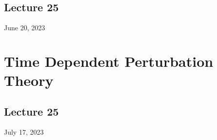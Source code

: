 \documentclass[12pt,fancychapters]{report}
\numberwithin{equation}{section}
\begin{document}
\newpage
\section{Lecture 25}
June 20, 2023





\newpage
\chapter{Time Dependent Perturbation Theory}
\section{Lecture 25}
July 17, 2023
\end{document}
